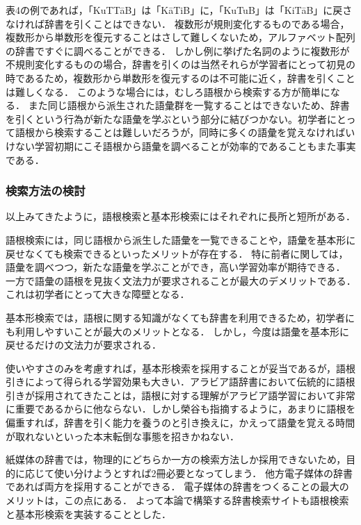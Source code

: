 \documentclass[technicalreport]{ieicej}
\begin{document}
表4の例であれば，「KuTTāB」は「KāTiB」に，「KuTuB」は「KiTāB」に戻さなければ辞書を引くことはできない．
複数形が規則変化するものである場合，複数形から単数形を復元することはさして難しくないため，アルファベット配列の辞書ですぐに調べることができる．
しかし例に挙げた名詞のように複数形が不規則変化するものの場合，辞書を引くのは当然それらが学習者にとって初見の時であるため，複数形から単数形を復元するのは不可能に近く，辞書を引くことは難しくなる．
このような場合には，むしろ語根から検索する方が簡単になる．
また同じ語根から派生された語彙群を一覧することはできないため、辞書を引くという行為が新たな語彙を学ぶという部分に結びつかない。初学者にとって語根から検索することは難しいだろうが，同時に多くの語彙を覚えなければいけない学習初期にこそ語根から語彙を調べることが効率的であることもまた事実である．

\subsubsection{検索方法の検討}
以上みてきたように，語根検索と基本形検索にはそれぞれに長所と短所がある．

語根検索には，同じ語根から派生した語彙を一覧できることや，語彙を基本形に戻せなくても検索できるといったメリットが存在する．
特に前者に関しては，語彙を調べつつ，新たな語彙を学ぶことができ，高い学習効率が期待できる．
一方で語彙の語根を見抜く文法力が要求されることが最大のデメリットである．
これは初学者にとって大きな障壁となる．

基本形検索では，語根に関する知識がなくても辞書を利用できるため，初学者にも利用しやすいことが最大のメリットとなる．
しかし，今度は語彙を基本形に戻せるだけの文法力が要求される．

使いやすさのみを考慮すれば，基本形検索を採用することが妥当であるが，語根引きによって得られる学習効果も大きい．アラビア語辞書において伝統的に語根引きが採用されてきたことは，語根に対する理解がアラビア語学習において非常に重要であるからに他ならない．しかし榮谷\cite{sakaedani2008}も指摘するように，あまりに語根を偏重すれば，辞書を引く能力を養うのと引き換えに，かえって語彙を覚える時間が取れないといった本末転倒な事態を招きかねない．

紙媒体の辞書では，物理的にどちらか一方の検索方法しか採用できないため，目的に応じて使い分けようとすれば2冊必要となってしまう．
他方電子媒体の辞書であれば両方を採用することができる．
電子媒体の辞書をつくることの最大のメリットは，この点にある．
よって本論で構築する辞書検索サイトも語根検索と基本形検索を実装することとした．
\end{document}
